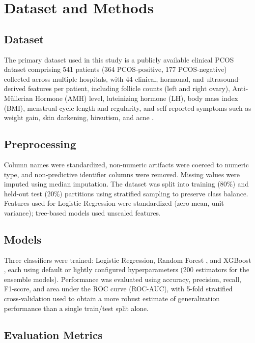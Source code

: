 \documentclass[conference]{IEEEtran}
\begin{document}
\section{Dataset and Methods}

\subsection{Dataset}

The primary dataset used in this study is a publicly available clinical PCOS dataset comprising 541 patients (364 PCOS-positive, 177 PCOS-negative) collected across multiple hospitals, with 44 clinical, hormonal, and ultrasound-derived features per patient, including follicle counts (left and right ovary), Anti-M\"{u}llerian Hormone (AMH) level, luteinizing hormone (LH), body mass index (BMI), menstrual cycle length and regularity, and self-reported symptoms such as weight gain, skin darkening, hirsutism, and acne \cite{kottarathil}.

\subsection{Preprocessing}

Column names were standardized, non-numeric artifacts were coerced to numeric type, and non-predictive identifier columns were removed. Missing values were imputed using median imputation. The dataset was split into training (80\%) and held-out test (20\%) partitions using stratified sampling to preserve class balance. Features used for Logistic Regression were standardized (zero mean, unit variance); tree-based models used unscaled features.

\subsection{Models}

Three classifiers were trained: Logistic Regression, Random Forest \cite{breiman2001}, and XGBoost \cite{chen2016}, each using default or lightly configured hyperparameters (200 estimators for the ensemble models). Performance was evaluated using accuracy, precision, recall, F1-score, and area under the ROC curve (ROC-AUC), with 5-fold stratified cross-validation used to obtain a more robust estimate of generalization performance than a single train/test split alone.

\subsection{Evaluation Metrics}
\end{document}
